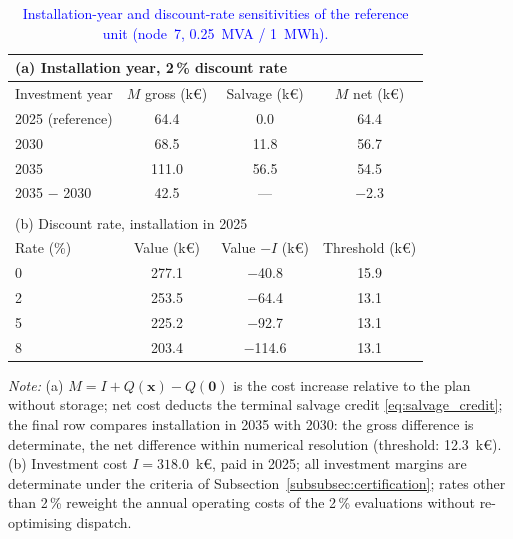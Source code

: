 \documentclass[preprint,12pt]{elsarticle}
\begin{document}
\begin{table}[htbp!]
    \centering
    \caption{\textcolor{blue}{Installation-year and discount-rate sensitivities of the reference unit (node~7, 0.25~MVA / 1~MWh).}}
    \label{tab:res_year_ladder}
    \footnotesize\setlength{\tabcolsep}{5pt}
    \begin{tabular}{l c c c}
        \multicolumn{4}{l}{(a) Installation year, 2\,\% discount rate} \\
        \toprule
        Investment year & $M$ gross (k\euro) & Salvage (k\euro) & $M$ net (k\euro) \\
        \midrule
        2025 (reference) & 64.4  & 0.0  & 64.4 \\
        2030             & 68.5  & 11.8 & 56.7 \\
        2035             & 111.0 & 56.5 & 54.5 \\
        2035 $-$ 2030    & 42.5  & ---  & $-$2.3 \\
        \bottomrule
        \multicolumn{4}{c}{} \\
        \multicolumn{4}{l}{(b) Discount rate, installation in 2025} \\
        \toprule
        Rate (\%) & Value (k\euro) & Value $- I$ (k\euro) & Threshold (k\euro) \\
        \midrule
        0 & 277.1 & $-$40.8  & 15.9 \\
        2 & 253.5 & $-$64.4  & 13.1 \\
        5 & 225.2 & $-$92.7  & 13.1 \\
        8 & 203.4 & $-$114.6 & 13.1 \\
        \bottomrule
    \end{tabular}
    \par\smallskip
    \begin{minipage}{\linewidth}
        \footnotesize\raggedright
        \textit{Note:}
        (a) $M = I + Q(\boldsymbol{x}) - Q(\boldsymbol{0})$ is the cost increase relative to the plan without storage; net cost deducts the terminal salvage credit \eqref{eq:salvage_credit}; the final row compares installation in 2035 with 2030: the gross difference is determinate, the net difference within numerical resolution (threshold: 12.3~k\euro{}).
        (b) Investment cost $I=318.0$~k\euro{}, paid in 2025; all investment margins are determinate under the criteria of Subsection~\ref{subsubsec:certification}; rates other than 2\,\% reweight the annual operating costs of the 2\,\% evaluations without re-optimising dispatch.
    \end{minipage}
\end{table}
\end{document}

